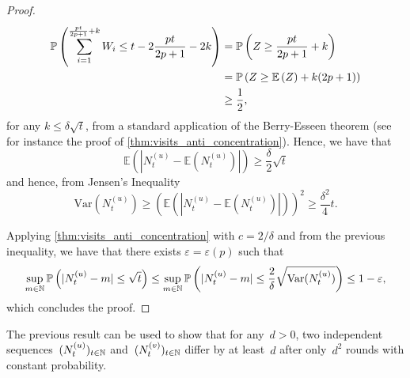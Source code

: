 \documentclass{article}
\newcommand{\Prob}[1]{\bbP\left(#1\right)}
\newcommand{\Expc}[1]{\mathbb{E}\left(#1\right)}
\begin{document}
\begin{proof}
\begin{align*}
    \Prob{\sum_{i=1}^{\frac{pt}{2p+1}+k}W_i \leq t- 2\frac{pt}{2p+1} - 2k} &= \Prob{Z \geq \frac{pt}{2p+1}+k}
    \\ & = \Prob{Z \geq \Expc{Z} + k(2p+1)} \\ & \geq \frac{1}{2},
\end{align*}
for any $k \leq \delta \sqrt{t}$, from a standard application  of the Berry-Esseen
theorem (see for instance the proof of \cref{thm:visits_anti_concentration}).
Hence, we have that
\[\Expc{|N_t^{(u)} - \Expc{N_t^{(u)}}|} \geq \frac{\delta}{2} \sqrt{t} \]
and hence, from Jensen's Inequality
\[\mathrm{Var}(N_t^{(u)}) \geq \left(\Expc{|N_t^{(u)} - \Expc{N_t^{(u)}}|}\right)^2 \geq \frac{\delta^2}{4} t.\]

Applying \cref{thm:visits_anti_concentration} with $c = 2/\delta$ and  from the previous inequality, we have that there exists $\varepsilon = \varepsilon(p)$ such that
\begin{equation*}
\sup_{m \in \mathbb{N}} \Prob{|N_t^{(u)}- m| \leq \sqrt{t}} \leq 
\sup_{m \in \mathbb{N}} \Prob{|N_t^{(u)}- m| \leq \frac{2}{\delta}\sqrt{\Var(N_t^{(u)})}} \leq 1-\varepsilon,
\end{equation*}
which concludes the proof.
\end{proof}

The previous result can be used to show that for any~$d > 0$, two independent sequences~$(N^{(u)}_t)_{t \in\operatorname{\mathbb{N}}}$ and~$(N^{(v)}_t)_{t \in\operatorname{\mathbb{N}}}$ differ by at least~$d$ after only~$d^2$ rounds with constant probability.
\end{document}
